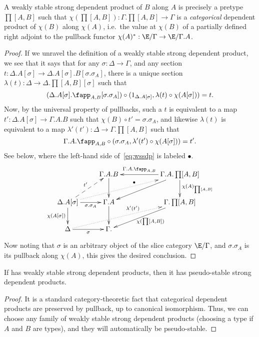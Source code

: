\documentclass{amsart}
\begin{document}
\begin{lem}\label{thm:categorical-pi}
  A weakly stable strong dependent product of $B$ along $A$ is precisely a pretype $\prod[A,B]$ such that $\chi(\prod[A,B]):\Gamma.\prod[A,B] \to \Gamma$ is a \emph{categorical} dependent product of $\chi(B)$ along $\chi(A)$, i.e.\ the value at $\chi(B)$ of a partially defined right adjoint to the pullback functor $\chi(A)^* : \E/\Gamma \to \E/\Gamma.A$.
\end{lem}
\begin{proof}
  If we unravel the definition of a weakly stable strong dependent product, we see that it says that for any $\sigma:\Delta\to\Gamma$, and any section $t:\Delta.A[\sigma] \to \Delta.A[\sigma].B[\sigma.\sigma_A]$, there is a unique section $\lambda(t) : \Delta \to \Delta.\prod[A,B][\sigma]$ such that
  \[ (\Delta.A[\sigma].\fapp_{A,B}[\sigma.\sigma_A]) \circ (1_{\Delta.A[\sigma]},\lambda(t) \circ \chi(A[\sigma])) = t. \]
  Now, by the universal property of pullbacks, such a $t$ is equivalent to a map $t':\Delta.A[\sigma] \to \Gamma.A.B$ such that $\chi(B) \circ t' = \sigma.\sigma_A$, and likewise $\lambda(t)$ is equivalent to a map $\lambda'(t'):\Delta \to \Gamma.\prod[A,B]$ such that
  \begin{equation}
    \Gamma.A.\fapp_{A,B} \circ {(\sigma.\sigma_A, \lambda'(t')\circ \chi(A[\sigma]))} = t'.\label{eq:wssdp}
  \end{equation}
  See below, where the left-hand side of~\eqref{eq:wssdp} is labeled $\bullet$.
  \begin{equation}
    \vcenter{\xymatrix{
        & \Gamma.A.B \ar[d]  &&
        \Gamma.A.\prod[A,B] \ar[dll] \ar[ll]_-{\Gamma.A.\fapp_{A,B}} \ar[d]^{\chi(A)_{\prod[A,B]}} \\
        \Delta.A[\sigma]\ar[r]_-{\sigma.\sigma_A}
        \ar@{.>}[urrr]^(.6){\bullet}
        \ar[d]_{\chi(A[\sigma])} \ar@{-->}[ur]^{t'} &
        \Gamma.A\ar[d] &&
        \Gamma.\prod[A,B] \ar[dll]^{\chi(\prod[A,B])} \\
        \Delta \ar[r]_\sigma \ar@{.>}[urrr]^(.6){\lambda'(t')} &
        \Gamma.
      }}
  \end{equation}
  Now noting that $\sigma$ is an arbitrary object of the slice category $\E/\Gamma$, and $\sigma.\sigma_A$ is its pullback along $\chi(A)$, this gives the desired conclusion.
\end{proof}

\begin{lem}
  If \E has weakly stable strong dependent products, then it has pseudo-stable strong dependent products.
\end{lem}
\begin{proof}
  It is a standard category-theoretic fact that categorical dependent products are preserved by pullback, up to canonical isomorphism.
  Thus, we can choose any family of weakly stable strong dependent products (choosing a type if $A$ and $B$ are types), and they will automatically be pseudo-stable.
\end{proof}
\end{document}
